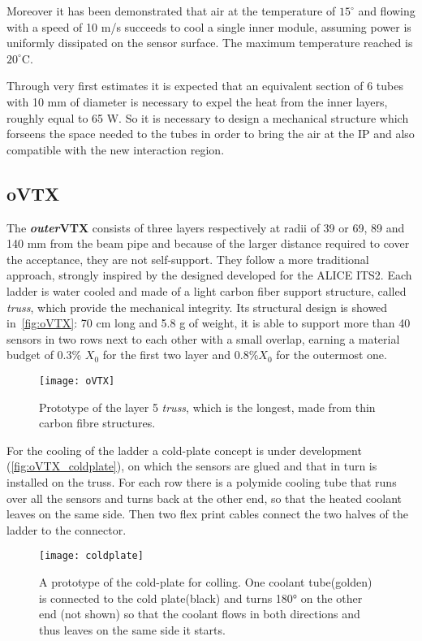 Moreover it has been demonstrated that air at the temperature of $15^{\circ}$ and flowing with a speed of 10 m/s succeeds to cool a single inner module, assuming power is uniformly dissipated on the sensor surface. The maximum temperature reached is $20^{\circ}$C. 

Through very first estimates it is expected that an equivalent section of 6 tubes with 10 mm of diameter is necessary to expel the heat from the inner layers, roughly equal to 65 W. So it is necessary to design a mechanical structure which forseens the space needed to the tubes in order to bring the air at the IP and also compatible with the new interaction region.


\subsection{oVTX} \label{sec:oVTX}

The \textbf{\textit{outer}VTX} consists of three layers respectively at radii of 39 or 69, 89 and 140 mm from the beam pipe and because of the larger distance required to cover the acceptance, they are not self-support. They follow a more traditional approach, strongly inspired by the designed developed for the ALICE ITS2. Each ladder is water cooled and made of a light carbon fiber support structure, called \textit{truss}, which provide the mechanical integrity. Its structural design is showed in~\autoref{fig:oVTX}: 70 cm long and 5.8 g of weight, it is able to support more than 40 sensors in two rows next to each other with a small overlap, earning a material budget of 0.3\% $X_{0}$ for the first two layer and 0.8\%$X_{0}$  for the outermost one.

\begin{figure}[h!]
\centering
\texttt{[image: oVTX]}
\caption{Prototype of the layer 5 \textit{truss}, which is the longest, made from thin carbon fibre structures.}
\label{fig:oVTX}
\end{figure}


For the cooling of the ladder a cold-plate concept is under development (\autoref{fig:oVTX_coldplate}), on which the sensors are glued and that in turn is installed on the truss. For each row there is a polymide cooling tube that runs over all the sensors and turns back at the other end, so that the heated coolant leaves on the same side. Then two flex print cables connect the two halves of the ladder to the connector.


\begin{figure}[h!]
\centering
\texttt{[image: coldplate]}
\caption{A prototype of the cold-plate for colling. One coolant tube(golden) is connected to the cold plate(black) and turns 180° on the other end (not shown) so that the coolant flows in both directions and thus leaves on the same side it starts.}
\label{fig:oVTX_coldplate}
\end{figure}

